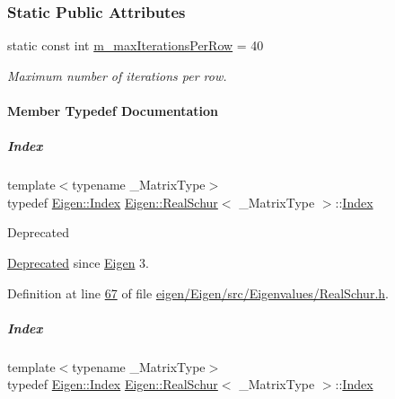 \subsubsection*{Static Public Attributes}
\begin{DoxyCompactItemize}
\item 
static const int \hyperlink{group___eigenvalues___module_ab42163ff22cd3ad98aa2bde39b4bbc79}{m\+\_\+max\+Iterations\+Per\+Row} = 40
\begin{DoxyCompactList}\small\item\em Maximum number of iterations per row. \end{DoxyCompactList}\end{DoxyCompactItemize}


\paragraph{Member Typedef Documentation}
\mbox{\label{group___eigenvalues___module_a8bd4653e2d9569a44ecc95e746422d3f}} 
\subparagraph{\texorpdfstring{Index}{Index}\hspace{0.1cm}{\footnotesize\ttfamily [1/2]}}
{\footnotesize\ttfamily template$<$typename \+\_\+\+Matrix\+Type$>$ \\
typedef \hyperlink{namespace_eigen_a62e77e0933482dafde8fe197d9a2cfde}{Eigen\+::\+Index} \hyperlink{group___eigenvalues___module_class_eigen_1_1_real_schur}{Eigen\+::\+Real\+Schur}$<$ \+\_\+\+Matrix\+Type $>$\+::\hyperlink{group___eigenvalues___module_a8bd4653e2d9569a44ecc95e746422d3f}{Index}}

\begin{DoxyRefDesc}{Deprecated}
\item[\hyperlink{deprecated__deprecated000022}{Deprecated}]since \hyperlink{namespace_eigen}{Eigen} 3. \end{DoxyRefDesc}


Definition at line \hyperlink{eigen_2_eigen_2src_2_eigenvalues_2_real_schur_8h_source_l00067}{67} of file \hyperlink{eigen_2_eigen_2src_2_eigenvalues_2_real_schur_8h_source}{eigen/\+Eigen/src/\+Eigenvalues/\+Real\+Schur.\+h}.

\mbox{\label{group___eigenvalues___module_a8bd4653e2d9569a44ecc95e746422d3f}} 
\subparagraph{\texorpdfstring{Index}{Index}\hspace{0.1cm}{\footnotesize\ttfamily [2/2]}}
{\footnotesize\ttfamily template$<$typename \+\_\+\+Matrix\+Type$>$ \\
typedef \hyperlink{namespace_eigen_a62e77e0933482dafde8fe197d9a2cfde}{Eigen\+::\+Index} \hyperlink{group___eigenvalues___module_class_eigen_1_1_real_schur}{Eigen\+::\+Real\+Schur}$<$ \+\_\+\+Matrix\+Type $>$\+::\hyperlink{group___eigenvalues___module_a8bd4653e2d9569a44ecc95e746422d3f}{Index}}

